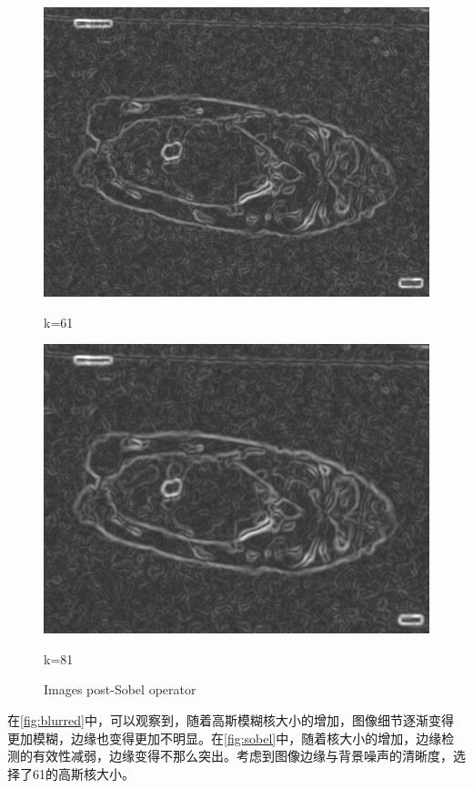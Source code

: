 \begin{figure}
\begin{minipage}{0.24\textwidth}
        \includegraphics[width=\textwidth]{./fig/gausssian/sobel61.jpg}
        \caption*{k=61}
        \label{fig:sobel61}
    \end{minipage}
    \begin{minipage}{0.24\textwidth}
        \centering
        \includegraphics[width=\textwidth]{./fig/gausssian/sobel81.jpg}
        \caption*{k=81}
        \label{fig:sobel81}
    \end{minipage}
    \caption{Images post-Sobel operator}
    \label{fig:sobel}
\end{figure}


在\autoref{fig:blurred}中，可以观察到，随着高斯模糊核大小的增加，图像细节逐渐变得更加模糊，边缘也变得更加不明显。在\autoref{fig:sobel}中，随着核大小的增加，边缘检测的有效性减弱，边缘变得不那么突出。考虑到图像边缘与背景噪声的清晰度，选择了61的高斯核大小。

